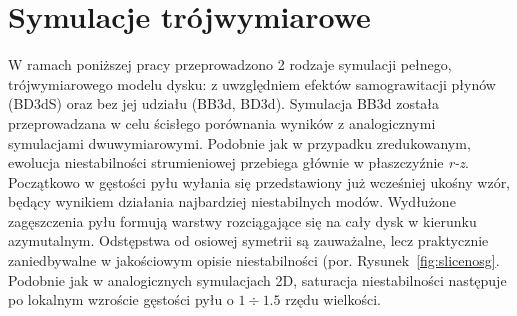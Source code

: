 \section{Symulacje trójwymiarowe}
W ramach poniższej pracy przeprowadzono 2 rodzaje symulacji pełnego,
trójwymiarowego modelu dysku: z uwzględniem efektów samograwitacji płynów
(BD3dS) oraz bez jej udziału (BB3d, BD3d). Symulacja BB3d została przeprowadzana
w celu ścisłego porównania wyników z analogicznymi symulacjami dwuwymiarowymi.
Podobnie jak w przypadku zredukowanym, ewolucja niestabilności strumieniowej
przebiega głównie w płaszczyźnie \textit{r-z}. Początkowo w gęstości pyłu
wyłania się przedstawiony już wcześniej ukośny wzór, będący wynikiem działania
najbardziej niestabilnych modów. Wydłużone zagęszczenia pyłu formują warstwy
rozciągające się na cały dysk w kierunku azymutalnym. Odstępstwa od osiowej
symetrii są zauważalne, lecz praktycznie zaniedbywalne w jakościowym opisie
niestabilności (por. Rysunek~\ref{fig:slicenosg}. Podobnie jak w analogicznych
symulacjach 2D, saturacja niestabilności następuje po lokalnym wzroście gęstości
pyłu o $1\div1.5$ rzędu wielkości.
%
